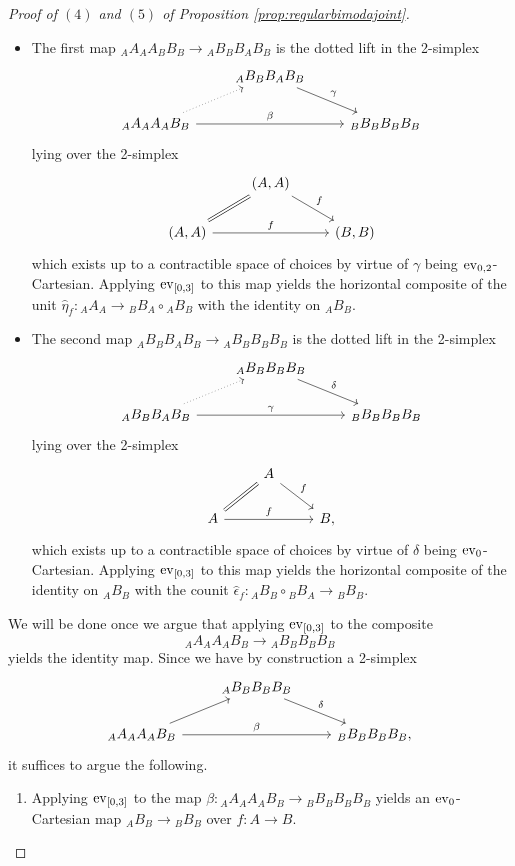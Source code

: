 \documentclass[10pt, reqno, twoside
, final
]{amsart}
\numberwithin{equation}{subsection}%
\theoremstyle{definition}
\theoremstyle{definition}
\theoremstyle{definition}
\theoremstyle{definition}
\theoremstyle{definition}
\theoremstyle{definition}
\theoremstyle{definition}
\theoremstyle{definition}
\theoremstyle{definition}
\theoremstyle{plain}
\theoremstyle{definition}
\theoremstyle{plain}
\theoremstyle{definition}
\theoremstyle{plain}
\theoremstyle{definition}
\theoremstyle{definition}
\theoremstyle{plain}
\theoremstyle{plain}
\theoremstyle{definition}
\theoremstyle{plain}
\theoremstyle{plain}
\theoremstyle{plain}
\begin{document}
\begin{proof}[Proof of $(4)$ and $(5)$ of Proposition \ref{prop:regularbimodajoint}]
\begin{itemize}
     \item The first map ${}_AA_AA_BB_B \rightarrow  {}_AB_BB_AB_B$ is the dotted lift in the 2-simplex
     \[
\begin{tikzcd}
&   {}_AB_BB_AB_B\ar[dr,"\gamma"] \\
{}_AA_AA_AB_B\ar[rr,"\beta"] \ar[ur,dotted] && {}_BB_B{}B_BB_B
\end{tikzcd}
\]
lying over the 2-simplex
\[
\begin{tikzcd}
&  (A,A)\ar[dr,"f"] \\
 (A,A)\ar[rr,"f"] \ar[ur,equal] && (B,B)
\end{tikzcd}
\]
which exists up to a contractible space of choices by virtue of $\gamma$ being $\mathrm{ev}_{0,2}$-Cartesian. Applying $\mathrm{ev}_{[0,3]}$ to this map yields the horizontal composite of the unit $\widehat{\eta}_f:{}_AA_A\rightarrow {}_BB_A\circ {}_AB_B$ with the identity on ${}_AB_B$.
\item The second map $ {}_AB_BB_AB_B \rightarrow  {}_AB_BB_BB_B$ is the dotted lift in the 2-simplex
     \[
\begin{tikzcd}
&    {}_AB_BB_BB_B\ar[dr,"\delta"] \\
{}_AB_BB_AB_B\ar[rr,"\gamma"] \ar[ur,dotted] && {}_BB_B{}B_BB_B
\end{tikzcd}
\]
lying over the 2-simplex
\[
\begin{tikzcd}
&  A\ar[dr,"f"] \\
 A\ar[rr,"f"] \ar[ur,equal] && B,
\end{tikzcd}
\]
which exists up to a contractible space of choices by virtue of $\delta$ being $\mathrm{ev}_{0}$-Cartesian. Applying $\mathrm{ev}_{[0,3]}$ to this map yields the horizontal composite of the identity on ${}_AB_B$ with the counit $\widehat{\epsilon}_f: {}_AB_B\circ {}_BB_A\rightarrow {}_BB_B$.
\end{itemize}
We will be done once we argue that applying $\mathrm{ev}_{[0,3]}$ to the composite 
\[  {}_AA_AA_AB_B \longrightarrow {}_AB_B B_B B_B  \]
yields the identity map. Since we have by construction a 2-simplex
\[
\begin{tikzcd}
& {}_AB_BB_BB_B\ar[dr,"\delta"] \\
 {}_AA_AA_AB_B\ar[rr,"\beta"] \ar[ur] && {}_BB_BB_BB_B,
\end{tikzcd}
\]
it suffices to argue the following.
\begin{enumerate}[$(1)$]
    \item Applying $\mathrm{ev}_{[0,3]}$ to the map $\beta:{}_AA_AA_AB_B \rightarrow {}_BB_BB_BB_B$ yields an $\mathrm{ev}_{0}$-Cartesian map ${}_AB_B\rightarrow {}_BB_B$ over $f:A\rightarrow B$.

\end{enumerate}
\end{proof}
\end{document}
